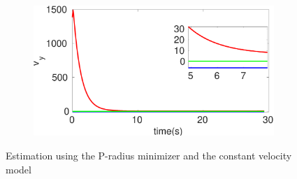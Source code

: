 \begin{figure}[h]
\begin{subfigure}{.5\linewidth}
\end{subfigure}
\begin{subfigure}{.5\linewidth}
\centering
\includegraphics[width=\linewidth]{figures/Prad/s3cvpradv_y}
\end{subfigure}
\caption{Estimation using the P-radius minimizer and the constant velocity model}
\end{figure}

